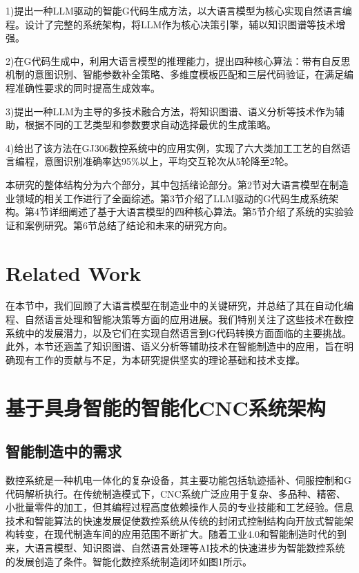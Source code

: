 \documentclass[preprint,12pt]{elsarticle}
\begin{document}
1)提出一种LLM驱动的智能G代码生成方法，以大语言模型为核心实现自然语言编程。设计了完整的系统架构，将LLM作为核心决策引擎，辅以知识图谱等技术增强。

2)在G代码生成中，利用大语言模型的推理能力，提出四种核心算法：带有自反思机制的意图识别、智能参数补全策略、多维度模板匹配和三层代码验证，在满足编程准确性要求的同时提高生成效率。

3)提出一种LLM为主导的多技术融合方法，将知识图谱、语义分析等技术作为辅助，根据不同的工艺类型和参数要求自动选择最优的生成策略。

4)给出了该方法在GJ306数控系统中的应用实例，实现了六大类加工工艺的自然语言编程，意图识别准确率达95\%以上，平均交互轮次从5轮降至2轮。

本研究的整体结构分为六个部分，其中包括绪论部分。第2节对大语言模型在制造业领域的相关工作进行了全面综述。第3节介绍了LLM驱动的G代码生成系统架构。第4节详细阐述了基于大语言模型的四种核心算法。第5节介绍了系统的实验验证和案例研究。第6节总结了结论和未来的研究方向。

\section{Related Work}

在本节中，我们回顾了大语言模型在制造业中的关键研究，并总结了其在自动化编程、自然语言处理和智能决策等方面的应用进展。我们特别关注了这些技术在数控系统中的发展潜力，以及它们在实现自然语言到G代码转换方面面临的主要挑战。此外，本节还涵盖了知识图谱、语义分析等辅助技术在智能制造中的应用，旨在明确现有工作的贡献与不足，为本研究提供坚实的理论基础和技术支撑。

\section{基于具身智能的智能化CNC系统架构}

\subsection{智能制造中的需求}

数控系统是一种机电一体化的复杂设备，其主要功能包括轨迹插补、伺服控制和G代码解析执行。在传统制造模式下，CNC系统广泛应用于复杂、多品种、精密、小批量零件的加工，但其编程过程高度依赖操作人员的专业技能和工艺经验。信息技术和智能算法的快速发展促使数控系统从传统的封闭式控制结构向开放式智能架构转变，在现代制造车间的应用范围不断扩大。随着工业4.0和智能制造时代的到来，大语言模型、知识图谱、自然语言处理等AI技术的快速进步为智能数控系统的发展创造了条件。智能化数控系统制造闭环如图1所示。
\end{document}
